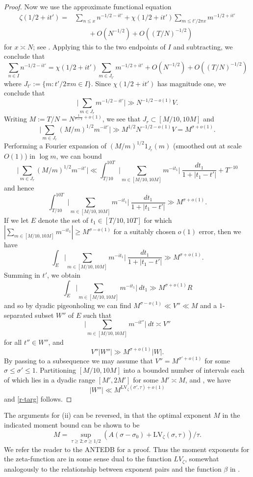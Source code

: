 \documentclass[a4paper, 10pt]{amsart}
\newcommand{\LV}{\mathrm{LV}}
\begin{document}
\begin{proof}
    Now we use the approximate functional equation
    \begin{align*}
        \zeta(1/2+it') = &\sum_{n \leq x} n^{-1/2-it'} + \chi(1/2+it') \sum_{m \leq t' / 2\pi x} m^{-1/2+it'} \\
        &\qquad + O(N^{-1/2}) + O((T/N)^{-1/2})
    \end{align*}
    for $x \asymp N$; see \cite[Theorem 4.1]{ivic}.  Applying this to the two endpoints of $I$ and subtracting, we conclude that
    $$ \sum_{n \in I} n^{-1/2-it'} =\chi(1/2+it') \sum_{m \in J_{t'}} m^{-1/2+it'} + O(N^{-1/2}) + O((T/N)^{-1/2})$$
    where $J_{t'} := \{ m: t' / 2\pi m \in I \}$. Since $\chi(1/2+it')$ has magnitude one, we conclude that
    $$ \bigg|\sum_{m \in J_r} m^{-1/2-it'}\bigg| \gg N^{-1/2-o(1)} V.$$
    Writing $M := T/N = N^{\frac{1}{\tau-1}+o(1)}$, we see that $J_r \subset [M/10, 10M]$ and
    $$ \bigg|\sum_{m \in J_r} (M/m)^{1/2} m^{-it'}\bigg| \gg M^{1/2} N^{-1/2-o(1)} V = M^{\sigma+o(1)}.$$
    Performing a Fourier expansion of $(M/m)^{1/2} 1_{J_r}(m)$ (smoothed out at scale $O(1)$) in $\log m$, we can bound
    $$ \bigg|\sum_{m \in J_r} (M/m)^{1/2} m^{-it'}\bigg| \ll \int_{T/10}^{10T} \bigg|\sum_{m \in [M/10,10M]} m^{-it_1}\bigg|\ \frac{dt_1}{1 + |t_1-t'|} + T^{-10}$$
    and hence
    $$ \int_{T/10}^{10T} \bigg|\sum_{m \in [M/10,10M]} m^{-it_1}\bigg|\ \frac{dt_1}{1 + |t_1-t'|} \gg M^{\sigma+o(1)}.$$
    If we let $E$ denote the set of $t_1 \in [T/10, 10T]$ for which $|\sum_{m \in [M/10,10M]} m^{-it_1}| \geq M^{\sigma-o(1)}$ for a suitably chosen $o(1)$ error, then we have
    $$ \int_E \bigg|\sum_{m \in [M/10,10M]} m^{-it_1}\bigg|\ \frac{dt_1}{1 + |t_1-t'|}  \gg M^{\sigma+o(1)}.$$
    Summing in $t'$, we obtain
    $$ \int_E \bigg|\sum_{m \in [M/10,10M]} m^{-it_1}\bigg|\ dt_1  \gg M^{\sigma+o(1)} R$$
    and so by dyadic pigeonholing we can find $M^{\sigma-o(1)} \ll V'' \ll M$ and a $1$-separated subset $W''$ of $E$ such that
    $$ \bigg|\sum_{m \in [M/10,10M]} m^{-it''}\bigg|\ dt \asymp V''$$
    for all $t'' \in W''$, and
    $$ V'' |W''| \gg M^{\sigma+o(1)} |W|.$$
    By passing to a subsequence we may assume that $V'' = M^{\sigma'+o(1)}$ for some $\sigma \leq \sigma' \leq 1$. Partitioning $[M/10,10M]$ into a bounded number of intervals each of which lies in a dyadic range $[M',2M']$ for some $M' \asymp M$, and , we have
    $$ |W''|  \ll M^{\LV_\zeta(\sigma',\tau)+o(1)}$$
    and \eqref{r-targ} follows.
\end{proof}

\begin{remark} The arguments for (ii) can be reversed, in that the optimal exponent $M$ in the indicated moment bound can be shown to be
$$ M = \sup_{\tau \geq 2; \sigma \geq 1/2} (A(\sigma-\sigma_0) + \LV_\zeta(\sigma,\tau))/\tau.$$
We refer the reader to the ANTEDB for a proof.  Thus the moment exponents for the zeta-function are in some sense dual to the function $LV_\zeta$, somewhat analogously to the relationship between exponent pairs and the function $\beta$ in .
\end{remark}
\end{document}
